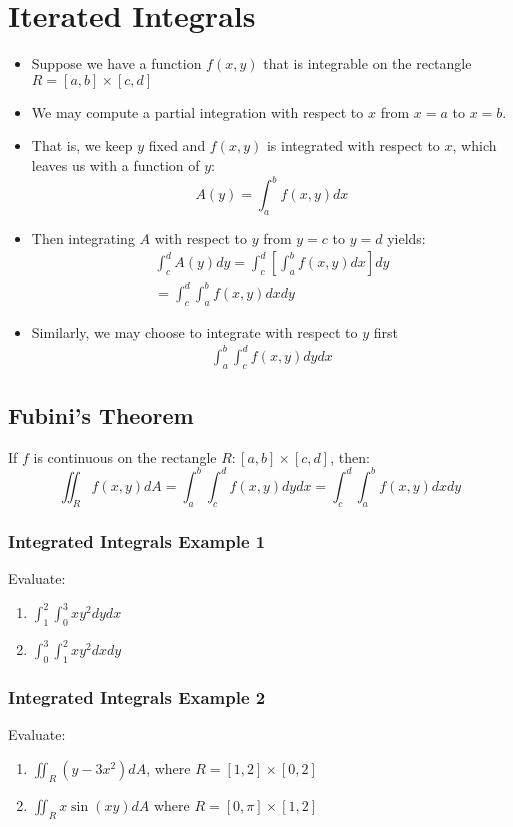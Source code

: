 \documentclass[12pt]{article}
\begin{document}
\section{Iterated Integrals}
\begin{itemize}
	\item Suppose we have a function \(f(x,y)\) that is integrable on the rectangle \(R= [a,b]\times [c,d]	\) 
	\item We may compute a partial integration with respect to \(x\) from \(x=a\) to \(x = b\).
	\item That is, we keep \(y \) fixed and \(f(x,y)\) is integrated with respect to \(x\), which leaves us with a function of \(y\):
		\[
			A(y) = \int_{a}^{b} f(x,y)dx
		\]
	\item Then integrating \(A\) with respect to \(y\) from \(y= c\) to \( y = d\) yields:
		\begin{align*}
			\int_{c}^{d} A(y)dy = \int_{c}^{d} [\int_{a}^{b} f(x,y)dx]dy\\
			= \int_{c}^{d} \int_{a}^{b} f(x,y)dxdy
		\end{align*}
	\item Similarly, we may choose to integrate with respect to \(y\) first
		\begin{align*}
			\label{eq:Respect to Y}
			\int_{a}^{b} \int_{c}^{d} f(x,y)dydx
		\end{align*}
\end{itemize}

\subsection{Fubini's Theorem}
If \(f\) is continuous on the rectangle \(R:[a,b] \times  [c,d]	\), then:
\[
	\iint_{R}f(x,y)dA = \int_{a}^{b} \int_{c}^{d} f(x,y)dydx = \int_{c}^{d} \int_{a}^{b} f(x,y)dxdy 
\] 

\subsubsection{Integrated Integrals Example 1} 
Evaluate: 
\begin{enumerate}
	\item \(\int_{1}^{2} \int_{0}^{3} xy^2dydx\)
	\item \(\int_{0}^{3} \int_{1}^{2} xy^2dxdy\)
\end{enumerate}

\subsubsection{Integrated Integrals Example 2}
Evaluate:
\begin{enumerate}
	\item \(\iint_{R}(y-3x^2)dA\), where \(R = [1,2] \times [0,2]\)
	\item \(\iint_{R}x\sin(xy)dA\) where \(R = [0,\pi] \times [1,2]\)
\end{enumerate}
\end{document}
